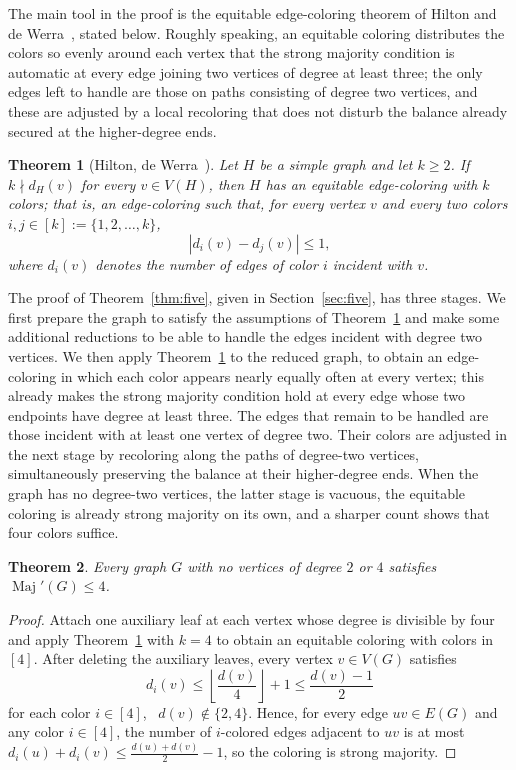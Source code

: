 \documentclass[11pt]{article}
\newtheorem{theorem}{Theorem}
\theoremstyle{definition}
\DeclareMathOperator{\Maj}{Maj}
\newcommand{\Majp}{\Maj'}
\begin{document}
The main tool in the proof is the equitable edge-coloring theorem of Hilton and
de Werra~\cite{hilton1994sufficient}, stated below. Roughly speaking, an equitable coloring distributes the colors so evenly around each vertex that the strong majority condition is automatic at every edge joining two vertices of degree at least three; the only edges left to handle are those on paths consisting of degree two vertices, and these are adjusted by a local recoloring that does not disturb the balance already secured at the higher-degree ends.

\begin{theorem}[Hilton, de Werra~{\cite{hilton1994sufficient}}]\label{thm:HdW}
Let \(H\) be a simple graph and let \(k\ge 2\). If \(k\nmid d_H(v)\) for every
\(v\in V(H)\), then \(H\) has an equitable edge-coloring with \(k\) colors; that
is, an edge-coloring such that, for every vertex \(v\) and every two colors
\(i,j\in[k] := \{1,2,\dots,k\}\),
\[
        |d_i(v)-d_j(v)|\le 1,
\]
where \(d_i(v)\) denotes the number of edges of color \(i\) incident
with \(v\).
\end{theorem}
The proof of Theorem~\ref{thm:five}, given in Section~\ref{sec:five}, has three stages. We first prepare the graph to satisfy the assumptions of Theorem~\ref{thm:HdW} and make some additional reductions to be able to handle the edges incident with degree two vertices. We then apply Theorem~\ref{thm:HdW} to the reduced graph, to obtain an edge-coloring in which each color appears nearly equally often at every vertex; this already makes the strong majority condition hold at every edge whose two endpoints have degree at least three. The edges that remain to be handled are those incident with at least one vertex of degree two. Their colors are adjusted in the next stage by recoloring along the paths of degree-two vertices, simultaneously preserving the balance at their higher-degree ends. When the graph has no degree-two vertices, the latter stage is vacuous, the equitable coloring is already strong majority on its own, and a sharper count shows that four colors suffice.

\begin{theorem}\label{cor:delta5}
Every graph \(G\) with no vertices of degree \(2\) or \(4\) satisfies
\(\Majp(G)\le 4\).
\end{theorem}

\begin{proof}
 Attach one auxiliary leaf at each vertex whose degree is divisible by four and apply Theorem~\ref{thm:HdW} with \(k=4\) to obtain an equitable coloring with colors in $[4]$. After deleting the auxiliary leaves, every vertex \(v\in V(G)\) satisfies
\[d_i(v)\le\left\lfloor \frac{d(v)}4\right\rfloor+1\le \frac{d(v)-1}2\] 
for each color \(i\in[4]\), \ \(d(v)\notin \{2,4\}\). Hence, for every edge \(uv\in E(G)\) and any color \(i\in[4]\), the number of \(i\)-colored edges adjacent to \(uv\) is at most \(d_i(u)+d_i(v)\le\frac{d(u)+d(v)}{2}-1\), so the coloring is strong majority.
\end{proof}
\end{document}
